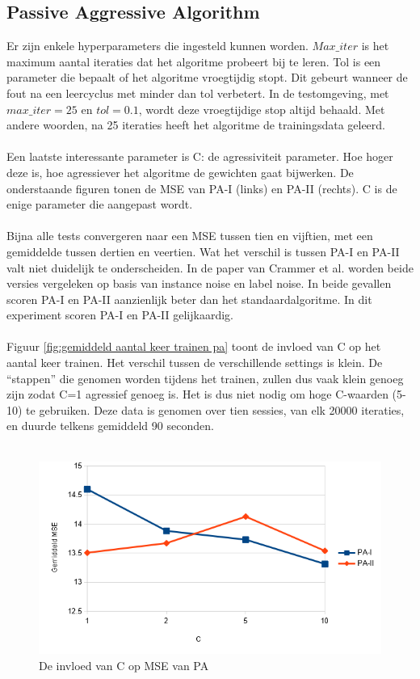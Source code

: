 \subsection{Passive Aggressive Algorithm}
Er zijn enkele hyperparameters die ingesteld kunnen worden. $Max\_ iter$ is het maximum aantal iteraties dat het algoritme probeert bij te leren. Tol is een parameter die bepaalt of het algoritme vroegtijdig stopt. Dit gebeurt wanneer de fout na een leercyclus met minder dan tol verbetert. In de testomgeving, met $max\_ iter=25$ en $tol=0.1$, wordt deze vroegtijdige stop altijd behaald. Met andere woorden, na 25 iteraties heeft het algoritme de trainingsdata geleerd.
\\\\
Een laatste interessante parameter is C: de agressiviteit parameter. Hoe hoger deze is, hoe agressiever het algoritme de gewichten gaat bijwerken. De onderstaande figuren tonen de MSE van PA-I (links) en PA-II (rechts). C is de enige parameter die aangepast wordt.
\\\\
Bijna alle tests convergeren naar een MSE tussen tien en vijftien, met een gemiddelde tussen dertien en veertien. Wat het verschil is tussen PA-I en PA-II valt niet duidelijk te onderscheiden. In de paper van Crammer et al. \cite{pa algorithm} worden beide versies vergeleken op basis van instance noise en label noise. In beide gevallen scoren PA-I en PA-II aanzienlijk beter dan het standaardalgoritme. In dit experiment scoren PA-I en PA-II gelijkaardig.
\\\\
Figuur \ref{fig:gemiddeld aantal keer trainen pa} toont de invloed van C op het aantal keer trainen. Het verschil tussen de verschillende settings is klein. De “stappen” die genomen worden tijdens het trainen, zullen dus vaak klein genoeg zijn zodat C=1 agressief genoeg is. Het is dus niet nodig om hoge C-waarden (5-10) te gebruiken. Deze data is genomen over tien sessies, van elk 20000 iteraties, en duurde telkens gemiddeld 90 seconden. 
\\\\
\begin{figure}[h]
	\includegraphics[width=\linewidth]{images/evaluatie/gemiddeldmsepa.png}
	\caption{De invloed van C op MSE van PA}
	\label{fig:invloed C op PA}
\end{figure}

